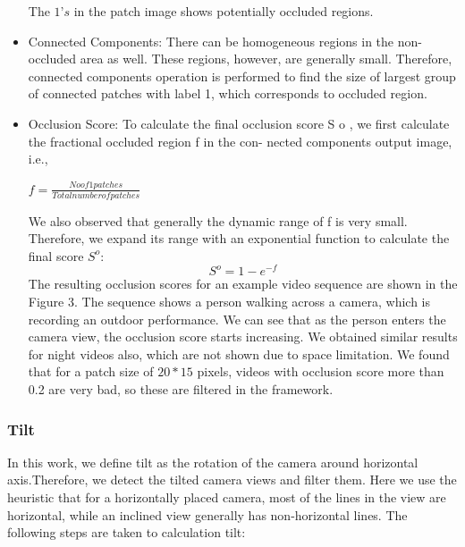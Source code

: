 \documentclass{sig-alternate-05-2015}
\begin{document}
\begin{itemize}
The $1’s$ in the patch image shows potentially occluded regions.
\item Connected Components: There can be homogeneous regions
in the non-occluded area as well. These regions, however, are
generally small. Therefore, connected components operation
is performed to find the size of largest group of connected
patches with label 1, which corresponds to occluded region.
\item Occlusion Score: To calculate the final occlusion score S o ,
we first calculate the fractional occluded region f in the con-
nected components output image, i.e.,
\begin{center}
\(f = \displaystyle \frac{No of 1 patches}{Total number of patches}\)
\end{center}
We also observed that generally the dynamic range of f is very
small. Therefore, we expand its range with an exponential function
to calculate the final score $S^o$:
\[ S^o = 1 - e^{-f} \]
The resulting occlusion scores for an example video sequence
are shown in the Figure 3. The sequence shows a person walking
across a camera, which is recording an outdoor performance. We
can see that as the person enters the camera view, the occlusion
score starts increasing. We obtained similar results for night videos
also, which are not shown due to space limitation. We found that
for a patch size of $20*15$ pixels, videos with occlusion score more
than 0.2 are very bad, so these are filtered in the framework.

\end{itemize}
\subsubsection{Tilt}
In this work, we define tilt as the rotation of the camera around
horizontal axis.Therefore, we detect the tilted camera views
and filter them. Here we use the heuristic that for a horizontally
placed camera, most of the lines in the view are horizontal, while
an inclined view generally has non-horizontal lines. The following
steps are taken to calculation tilt:
\end{document}
